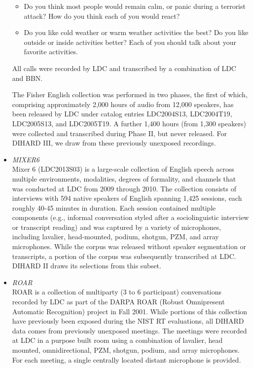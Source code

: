 \documentclass{article}
\begin{document}
\begin{appendices}
\begin{itemize}
\begin{itemize}
                    \item Do you think most people would remain calm, or panic during a terrorist attack? How do you think each of you would react?
                    \item Do you like cold weather or warm weather activities the best? Do you like outside or inside activities better? Each of you should talk about your favorite activities.
                \end{itemize}
            All calls were recorded by LDC and transcribed by a combination of LDC and BBN.

            The Fisher English collection was performed in two phases, the first of which, comprising approximately 2,000 hours of audio from 12,000 speakers, has been released by LDC under catalog entries LDC2004S13, LDC2004T19, LDC2005S13, and LDC2005T19. A further 1,400 hours (from 1,300 speakers) were collected and transcribed during Phase II, but never released. For DIHARD III, we draw from these previously unexposed recordings.
        \item {\it MIXER6} \\
            Mixer 6 (LDC2013S03) is a large-scale collection of English speech across multiple environments, modalities, degrees of formality, and channels that was conducted at LDC from 2009 through 2010. The collection consists of interviews with 594 native speakers of English spanning 1,425 sessions, each roughly 40-45 minutes in duration. Each session contained multiple components (e.g., informal conversation styled after a sociolinguistic interview or transcript reading) and was captured by a variety of microphones, including lavalier, head-mounted, podium, shotgun, PZM, and array microphones. While the corpus was released without speaker segmentation or transcripts, a portion of the corpus was subsequently transcribed at LDC. DIHARD II draws its selections from this subset.
        \item {\it ROAR} \\
            ROAR is a collection of multiparty (3 to 6 participant) conversations recorded by LDC as part of the DARPA ROAR (Robust Omnipresent Automatic Recognition) project in Fall 2001. While portions of this collection have previously been exposed during the NIST RT evaluations, all DIHARD data comes from previously unexposed meetings. The meetings were recorded at LDC in a purpose built room using a combination of lavalier, head mounted, omnidirectional, PZM, shotgun, podium, and array microphones. For each meeting, a single centrally located distant microphone is provided.

\end{itemize}
\end{appendices}
\end{document}
